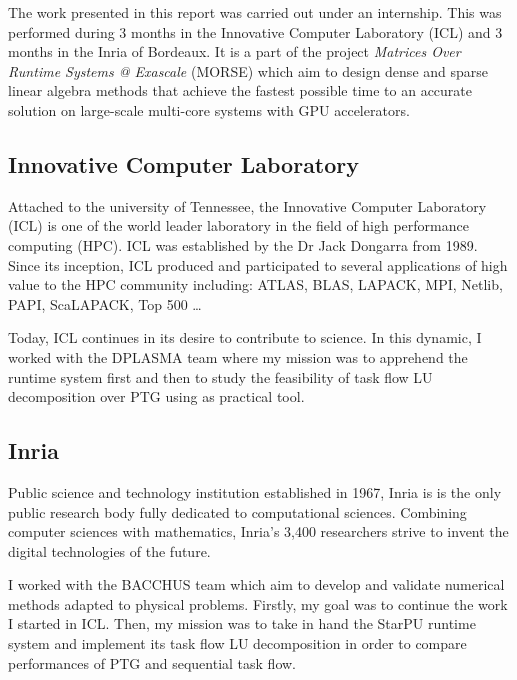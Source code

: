 The work presented in this report was carried out under an internship. This was performed during 3 months in the Innovative Computer Laboratory (ICL) and 3 months in the Inria of Bordeaux. It is a part of the project \emph{Matrices Over Runtime Systems @ Exascale} (MORSE) which aim to design dense and sparse linear algebra methods that achieve the fastest possible time to an accurate solution on large-scale multi-core systems with GPU accelerators.

\subsection*{Innovative Computer Laboratory}
Attached to the university of Tennessee, the Innovative Computer Laboratory (ICL) is one of the world leader laboratory in the field of high performance computing (HPC). ICL was established by the Dr Jack Dongarra from 1989. Since its inception, ICL produced and participated to several applications of high value to the HPC community including: ATLAS, BLAS, LAPACK, MPI, Netlib, PAPI, ScaLAPACK, Top 500 \dots

Today, ICL continues in its desire to contribute to science. In this dynamic, I worked with the DPLASMA team where my mission was to apprehend the \dague runtime system first and then to study the feasibility of task flow LU decomposition over PTG using \dague as practical tool.

\subsection*{Inria}
Public science and technology institution established in 1967, Inria is is the only public research body fully dedicated to computational sciences. Combining computer sciences with mathematics, Inria’s 3,400 researchers strive to invent the digital technologies of the future.

I worked with the BACCHUS team which aim to develop and validate numerical methods adapted to physical problems. Firstly, my goal was to continue the work I started in ICL. Then, my mission was to take in hand the StarPU runtime system and implement its task flow LU decomposition in order to compare performances of PTG and sequential task flow.